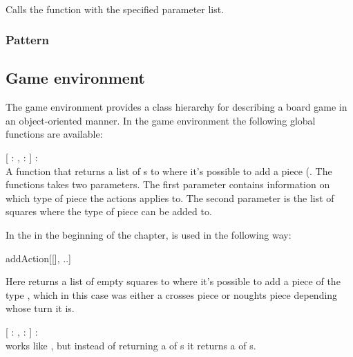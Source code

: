 \begin{dlist}
  \item {}\\
    Calls the function with the specified parameter list. 
\end{dlist}

\subsubsection{Pattern}

\subsection{Game environment}
\label{sec:gameenvironment}

The game environment provides a class hierarchy for describing a board game in an object-oriented manner.
In the game environment the following global functions are available:

\begin{dlist}
  \item {}[ : ,  : ] : \\
    A function that returns a list of s to where it's possible to add a piece (. The functions
    takes two parameters. The first parameter contains information on which type of piece the actions applies to. The second parameter is
    the list of squares where the type of piece can be added to.
    
    In the  in the beginning of the chapter,  is used in the following
    way: \\
    \begin{center}
    {addAction}[[], ..]
    \end{center}
    
    Here  returns a list of empty squares to where it's possible to add a piece of the type , which in this case was
    either a crosses piece or noughts piece depending whose turn it is.
    
  \item {}[ : ,  : ] : \\
   works like , but instead of returning a  of s it returns a  of s.
  	
    
\end{dlist}



